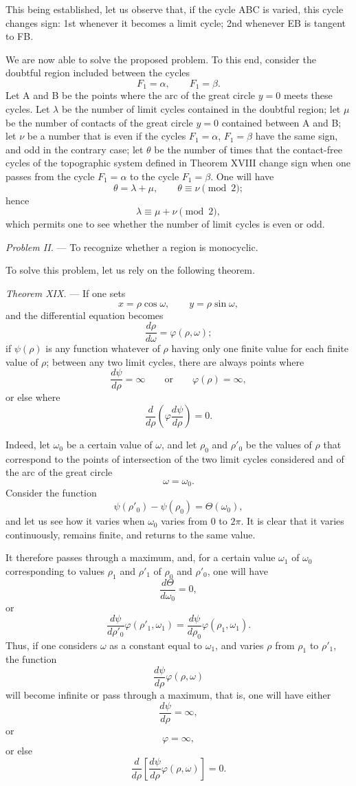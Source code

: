 \documentclass[11pt]{article}
\begin{document}
This being established, let us observe that, if the cycle ABC is varied, this cycle changes sign: 1st whenever it becomes a limit cycle; 2nd whenever EB is tangent to FB.

We are now able to solve the proposed problem. To this end, consider the doubtful region included between the cycles
\[
F_1=\alpha,
\qquad
F_1=\beta.
\]
Let A and B be the points where the arc of the great circle $y=0$ meets these cycles. Let $\lambda$ be the number of limit cycles contained in the doubtful region; let $\mu$ be the number of contacts of the great circle $y=0$ contained between A and B; let $\nu$ be a number that is even if the cycles $F_1=\alpha$, $F_1=\beta$ have the same sign, and odd in the contrary case; let $\theta$ be the number of times that the contact-free cycles of the topographic system defined in Theorem XVIII change sign when one passes from the cycle $F_1=\alpha$ to the cycle $F_1=\beta$. One will have
\[
\theta=\lambda+\mu,
\qquad
\theta\equiv\nu\pmod 2;
\]
hence
\[
\lambda\equiv\mu+\nu\pmod 2,
\]
which permits one to see whether the number of limit cycles is even or odd.

\emph{Problem II.} --- To recognize whether a region is monocyclic.

To solve this problem, let us rely on the following theorem.

\emph{Theorem XIX.} --- If one sets
\[
x=\rho\cos\omega,
\qquad
 y=\rho\sin\omega,
\]
and the differential equation becomes
\[
\frac{d\rho}{d\omega}=\varphi(\rho,\omega);
\]
if $\psi(\rho)$ is any function whatever of $\rho$ having only one finite value for each finite value of $\rho$; between any two limit cycles, there are always points where
\[
\frac{d\psi}{d\rho}=\infty
\qquad\text{or}\qquad
\varphi(\rho)=\infty,
\]
or else where
\[
\frac{d}{d\rho}\left(\varphi\frac{d\psi}{d\rho}\right)=0.
\]

Indeed, let $\omega_0$ be a certain value of $\omega$, and let $\rho_0$ and $\rho'_0$ be the values of $\rho$ that correspond to the points of intersection of the two limit cycles considered and of the arc of the great circle
\[
\omega=\omega_0.
\]
Consider the function
\[
\psi(\rho'_0)-\psi(\rho_0)=\Theta(\omega_0),
\]
and let us see how it varies when $\omega_0$ varies from 0 to $2\pi$. It is clear that it varies continuously, remains finite, and returns to the same value.

It therefore passes through a maximum, and, for a certain value $\omega_1$ of $\omega_0$ corresponding to values $\rho_1$ and $\rho'_1$ of $\rho_0$ and $\rho'_0$, one will have
\[
\frac{d\Theta}{d\omega_0}=0,
\]
or
\[
\frac{d\psi}{d\rho'_0}\varphi(\rho'_1,\omega_1)=\frac{d\psi}{d\rho_0}\varphi(\rho_1,\omega_1).
\]
Thus, if one considers $\omega$ as a constant equal to $\omega_1$, and varies $\rho$ from $\rho_1$ to $\rho'_1$, the function
\[
\frac{d\psi}{d\rho}\varphi(\rho,\omega)
\]
will become infinite or pass through a maximum, that is, one will have either
\[
\frac{d\psi}{d\rho}=\infty,
\]
or
\[
\varphi=\infty,
\]
or else
\[
\frac{d}{d\rho}\left[\frac{d\psi}{d\rho}\varphi(\rho,\omega)\right]=0.
\]
\end{document}
